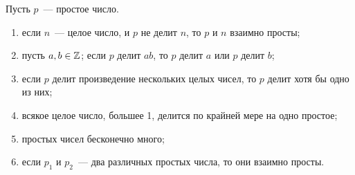 \begin{proposition}\label{primes_properties}
Пусть $p$~--- простое число.
\begin{enumerate}
\item если $n$~--- целое число, и $p$ не делит $n$, то $p$ и
  $n$ взаимно просты;\label{primes_prop1}
\item пусть $a,b\in\mathbb Z$; если $p$ делит $ab$, то $p$ делит $a$ или $p$
  делит $b$;\label{primes_prop2}
\item если $p$ делит произведение нескольких целых чисел,
  то $p$ делит хотя бы одно из них;\label{primes_prop6}
\item всякое целое число, большее 1, делится по крайней мере на одно
  простое;\label{primes_prop3}
\item простых чисел бесконечно много;
\item если $p_1$ и $p_2$~--- два различных простых числа,
  то они взаимно просты.\label{primes_prop5}
\end{enumerate}
\end{proposition}

